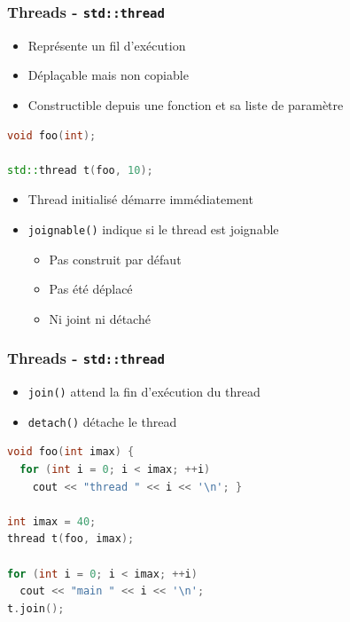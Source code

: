 \documentclass[C++.tex]{subfiles}
\begin{document}
\begin{frame}[fragile]
	\frametitle{Threads - \lstinline|std::thread|}
	\begin{itemize}
		\item Représente un fil d'exécution
		\item Déplaçable mais non copiable
		\item Constructible depuis une fonction et sa liste de paramètre
	\end{itemize}

	\begin{lstlisting}[language=C++]
void foo(int);

std::thread t(foo, 10);\end{lstlisting}

	\begin{itemize}
		\item Thread initialisé démarre immédiatement
		\item \lstinline|joignable()| indique si le thread est joignable
		\begin{itemize}
			\item Pas construit par défaut
			\item Pas été déplacé
			\item Ni joint ni détaché
		\end{itemize}
	\end{itemize}
\end{frame}

\begin{frame}[fragile]
	\frametitle{Threads - \lstinline|std::thread|}
	\begin{itemize}
		\item \lstinline|join()| attend la fin d'exécution du thread
		\item \lstinline|detach()| détache le thread
	\end{itemize}

	\begin{lstlisting}[language=C++]
void foo(int imax) {
  for (int i = 0; i < imax; ++i)
    cout << "thread " << i << '\n'; }

int imax = 40;
thread t(foo, imax);

for (int i = 0; i < imax; ++i)
  cout << "main " << i << '\n';
t.join();\end{lstlisting}
\end{frame}
\end{document}

